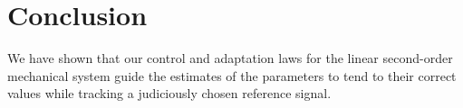 \section{Conclusion}
\label{sec:conclusion}

We have shown that our control and adaptation laws for the linear second-order
mechanical system guide the estimates of the parameters to tend to their correct
values while tracking a judiciously chosen reference signal.
